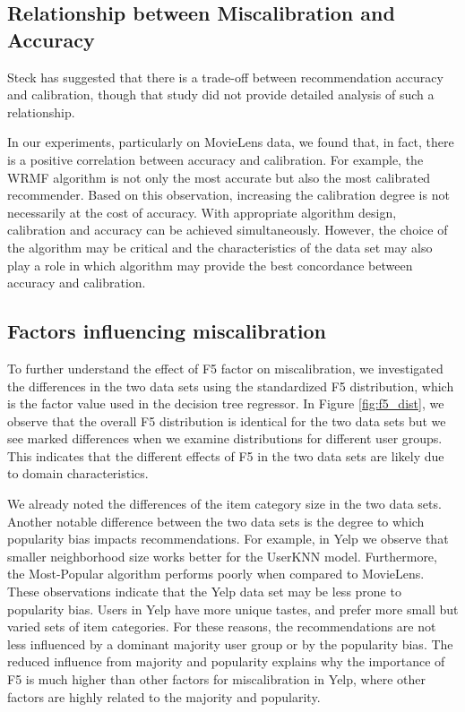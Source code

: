 \subsection{Relationship between Miscalibration and Accuracy} 

Steck \cite{steck2018calibrated} has suggested that there is a trade-off between recommendation accuracy and calibration, though that study did not provide detailed analysis of such a relationship.

In our experiments, particularly on MovieLens data, we found that, in fact, there is a positive correlation between accuracy and calibration. For example, the WRMF algorithm is not only the most accurate but also the most calibrated recommender. Based on this observation, increasing the calibration degree is not necessarily at the cost of accuracy. With appropriate algorithm design, calibration and accuracy can be achieved simultaneously. However, the choice of the algorithm may be critical and the characteristics of the data set may also play a role in which algorithm may provide the best concordance between accuracy and calibration.

\subsection{Factors influencing miscalibration}


To further understand the effect of F5 factor on miscalibration, we investigated the differences in the two data sets using the standardized F5 distribution, which is the factor value used in the decision tree regressor. In Figure \ref{fig:f5_dist}, we observe that the overall F5 distribution is identical for the two data sets but we see marked differences when we examine distributions for different user groups. This indicates that the different effects of F5 in the two data sets are likely due to domain characteristics. 
 
We already noted the differences of the item category size in the two data sets. Another notable difference between the two data sets is the degree to which popularity bias impacts recommendations. For example, in Yelp we observe that smaller neighborhood size works better for the UserKNN model. Furthermore, the Most-Popular algorithm performs poorly when compared to MovieLens. These observations indicate that the Yelp data set may be less prone to popularity bias. Users in Yelp have more unique tastes, and prefer more small but varied sets of item categories. For these reasons, the recommendations are not less influenced by a dominant majority user group or by the popularity bias. The reduced influence from majority and popularity explains why the importance of F5 is much higher than other factors for miscalibration in Yelp, where other factors are highly related to the majority and popularity.
 
